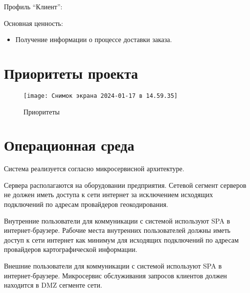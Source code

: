 Профиль ``Клиент'':

Основная ценность:
\begin{itemize}
    \item Получение информации о процессе доставки заказа.
\end{itemize}


\section{Приоритеты проекта}
\label{sec:priorities}

\begin{figure}[H]
    \centering
    \texttt{[image: Снимок экрана 2024-01-17 в 14.59.35]}
    \caption{Приоритеты}
    \label{fig:}
\end{figure}


\section{Операционная среда}
\label{sec:env}

Система реализуется согласно микросервисной архитектуре.

Сервера располагаются на оборудовании предприятия.
Сетевой сегмент серверов не должен иметь доступа к сети интернет за исключением исходящих подключений по адресам провайдеров геокодирования.

Внутренние пользователи для коммуникации с системой используют SPA в интернет-браузере.
Рабочие места внутренних пользователей должны иметь доступ к сети интернет как минимум для исходящих подключений по адресам провайдеров картографической информации.

Внешние пользователи для коммуникации с системой используют SPA в интернет-браузере.
Микросервис обслуживания запросов клиентов должен находится в DMZ сегменте сети.

\endinput
